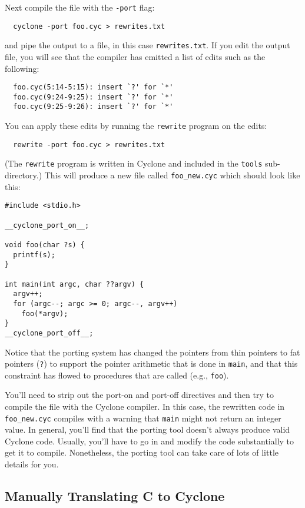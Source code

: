 Next compile the file with the \texttt{-port} flag:
\begin{verbatim}
  cyclone -port foo.cyc > rewrites.txt
\end{verbatim}
and pipe the output to a file, in this case \texttt{rewrites.txt}.
If you edit the output file, you will see that the compiler has
emitted a list of edits such as the following:
\begin{verbatim}
  foo.cyc(5:14-5:15): insert `?' for `*'
  foo.cyc(9:24-9:25): insert `?' for `*'
  foo.cyc(9:25-9:26): insert `?' for `*'
\end{verbatim}
You can apply these edits by running the \texttt{rewrite} program
on the edits:
\begin{verbatim}
  rewrite -port foo.cyc > rewrites.txt
\end{verbatim}
(The \texttt{rewrite} program is written in Cyclone and included
in the \texttt{tools} sub-directory.)  This will produce a new
file called \texttt{foo_new.cyc} which should look like this:
\begin{verbatim}
#include <stdio.h>

__cyclone_port_on__;

void foo(char ?s) { 
  printf(s);
}

int main(int argc, char ??argv) {
  argv++;
  for (argc--; argc >= 0; argc--, argv++) 
    foo(*argv);
}
__cyclone_port_off__;
\end{verbatim}
Notice that the porting system has changed the pointers from
thin pointers to fat pointers (\texttt{?}) to support the pointer
arithmetic that is done in \texttt{main}, and that this 
constraint has flowed to procedures that are called (e.g., \texttt{foo}).

You'll need to strip out the port-on and port-off directives and
then try to compile the file with the Cyclone compiler.  In this
case, the rewritten code in \texttt{foo_new.cyc} compiles with
a warning that \texttt{main} might not return an integer value.
In general, you'll find that the porting tool doesn't always
produce valid Cyclone code.  Usually, you'll have to go in and
modify the code substantially to get it to compile.  Nonetheless,
the porting tool can take care of lots of little details for
you.  

\subsection{Manually Translating C to Cyclone}

